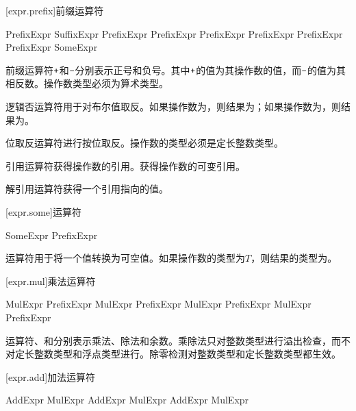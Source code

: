 [expr.prefix]{前缀运算符}

\begin{bnf}{PrefixExpr}
    SuffixExpr \br
    \terminal{+} PrefixExpr \br
    \terminal{-} PrefixExpr \br
    \terminal{!} PrefixExpr \br
     PrefixExpr \br
    \terminal{\&} \bnfq PrefixExpr \br
    \terminal{*} PrefixExpr \br
    SomeExpr
\end{bnf}

\pnum
前缀运算符$\mathbin{\texttt{+}}$和$\mathbin{\texttt{-}}$分别表示正号和负号。其中$\mathbin{\texttt{+}}$的值为其操作数的值，而$\mathbin{\texttt{-}}$的值为其相反数。操作数类型必须为算术类型。

\pnum
逻辑否运算符\tcode{!}用于对布尔值取反。如果操作数为，则结果为；如果操作数为，则结果为。

\pnum
位取反运算符进行按位取反。操作数的类型必须是定长整数类型。

\pnum
引用运算符\tcode{\&}获得操作数的引用。获得操作数的可变引用。

\pnum
解引用运算符\tcode{*}获得一个引用指向的值。

[expr.some]{运算符}

\begin{bnf}{SomeExpr}
     PrefixExpr
\end{bnf}

\pnum
{}运算符用于将一个值转换为可空值。如果操作数的类型为$T$，则结果的类型为。

[expr.mul]{乘法运算符}

\begin{bnf}{MulExpr}
    PrefixExpr \br
    MulExpr \terminal{*} PrefixExpr \br
    MulExpr \terminal{/} PrefixExpr \br
    MulExpr \terminal{\%} PrefixExpr
\end{bnf}

\pnum
运算符\tcode{*}、\tcode{/}和\tcode{\%}分别表示乘法、除法和余数。乘除法只对整数类型进行溢出检查，而不对定长整数类型和浮点类型进行。除零检测对整数类型和定长整数类型都生效。

[expr.add]{加法运算符}

\begin{bnf}{AddExpr}
    MulExpr \br
    AddExpr \terminal{+} MulExpr \br
    AddExpr \terminal{-} MulExpr
\end{bnf}

